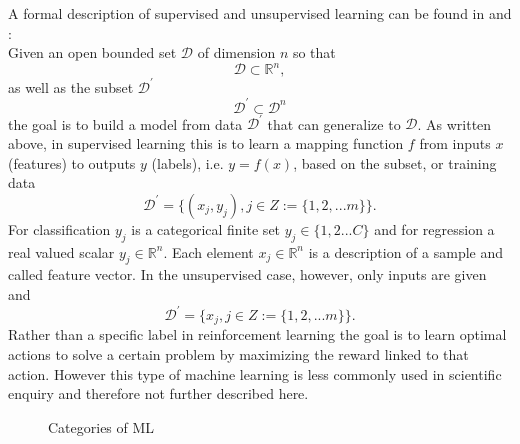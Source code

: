 A formal description of supervised and unsupervised learning can be found in \cite{Brunton_kutz_2019} and \cite{Murphy2012}:\\
Given an open bounded set \(\mathcal{D}\) of dimension \(n\) so that
\begin{equation}
    \mathcal{D}\subset\mathbb{R}^{n},
\end{equation}
as well as the subset \(\mathcal{D}^{'}\) 
\begin{equation}
    \mathcal{D}^{'}\subset\mathcal{D}^{n}
\end{equation}
the goal is to build a model from data \(\mathcal{D}^{'}\) that can generalize to \(\mathcal{D}\). As written above, in supervised learning this is to learn a mapping function \(f\) from inputs \(x\) (features) to outputs \(y\) (labels), i.e. \(y = f(x)\), based on the subset, or training data
\begin{equation}
    \mathcal{D}^{'}=\{(x_j, y_j), j \in Z := \{1,2,...m\}\}. 
\end{equation}
For classification \(y_j\) is a categorical finite set \(y_j \in \{1,2...C\}\) and for regression a real valued scalar \(y_j \in \mathbb R^{n}\). Each element \(x_j \in \mathbb R^{n}\) is a description of a sample and called feature vector.
In the unsupervised case, however, only inputs are given and 
\begin{equation}
    \mathcal{D}^{'}=\{x_j, j \in Z := \{1,2,...m\}\}. 
\end{equation}
Rather than a specific label in reinforcement learning the goal is to learn optimal actions to solve a certain problem by maximizing the reward linked to that action. However this type of machine learning is less commonly used in scientific enquiry and therefore not further described here.\\
\begin{figure*}[h]
  \caption{Categories of ML}
  \label{fig1:ml_types}
\end{figure*}

